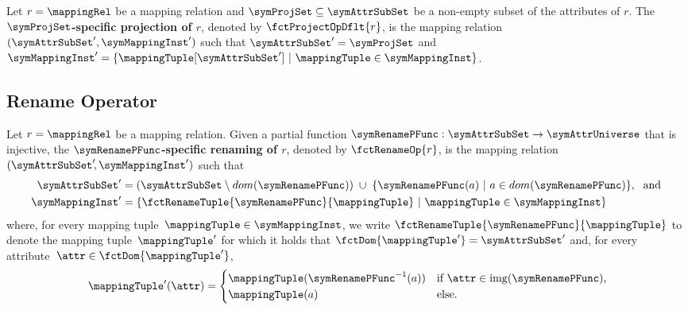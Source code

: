 \begin{definition}
	\label{def:projection_operator}
	Let $r = \mappingRel$ be a mapping relation and $\symProjSet \subseteq
		\symAttrSubSet$ be a non-empty subset of the
	attributes of $r$.
	The \textbf{$\symProjSet$-specific projection of $r$}, denoted by
    $\fctProjectOpDflt{r}$, is the mapping relation $(\symAttrSubSet',
		\symMappingInst')$ such that $\symAttrSubSet' = \symProjSet$ 
        and $\symMappingInst' = \{ \mappingTuple[\symAttrSubSet'] \ | \
		\mappingTuple \in \symMappingInst \}$.
\end{definition}




\subsection{Rename Operator}%
\label{sub:rename_operator}


\begin{definition}
	\label{def:rename_operator}
	Let $r = \mappingRel$ be a mapping relation.
	Given a partial function
	$\symRenamePFunc: \symAttrSubSet \rightarrow \symAttrUniverse$
	that is injective,
    the \textbf{$\symRenamePFunc$-specific renaming of $r$}, denoted by $\fctRenameOp{r}$, 
	is the mapping relation $(\symAttrSubSet'\!, \symMappingInst')$ such that
	\begin{align*}
		\symAttrSubSet'  & =  (\symAttrSubSet \setminus dom(\symRenamePFunc)) \; \cup \;
		\{ \symRenamePFunc(a) \ |  \ a \in dom(\symRenamePFunc) \}, \; \text{ and }                                       \\
		\symMappingInst' & = \{ \fctRenameTuple{\symRenamePFunc}{\mappingTuple}\ | \ \mappingTuple \in \symMappingInst\}
	\end{align*}
	where, for every mapping tuple~$\mappingTuple \in \symMappingInst$, we write $\fctRenameTuple{\symRenamePFunc}{\mappingTuple}$ to denote the mapping tuple~$\mappingTuple'$ for which it holds that $\fctDom{\mappingTuple'} = \symAttrSubSet'$ and, for every attribute~$\attr \in \fctDom{\mappingTuple'}$,
	\begin{equation*}
		\mappingTuple'(\attr) =
		\begin{cases}
			\mappingTuple(\symRenamePFunc^{-1}(a)) & \text{if $\attr \in \mathrm{img}(\symRenamePFunc)$,} \\
			\mappingTuple(a)                       & \text{else.}
		\end{cases}
	\end{equation*}
\end{definition}

